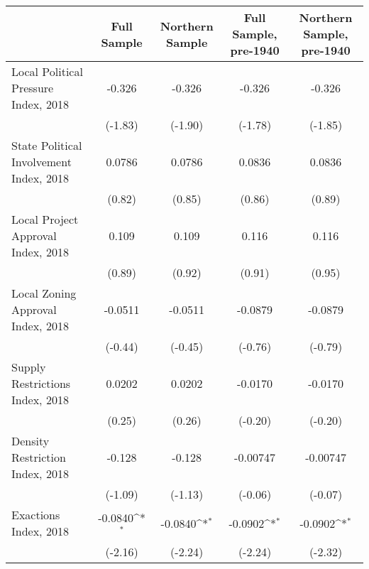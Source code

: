\begin{table}[htbp]\centering
\def\sym#1{\ifmmode^{#1}\else\(^{#1}\)\fi}
\caption{ \label{tab1}}
\begin{tabular}{l*{4}{c}}
\toprule
                    &\multicolumn{1}{c}{Full Sample}&\multicolumn{1}{c}{Northern Sample}&\multicolumn{1}{c}{Full Sample, pre-1940}&\multicolumn{1}{c}{Northern Sample, pre-1940}\\
\midrule
Local Political Pressure Index, 2018&      -0.326         &      -0.326         &      -0.326         &      -0.326         \\
                    &     (-1.83)         &     (-1.90)         &     (-1.78)         &     (-1.85)         \\
\addlinespace
State Political Involvement Index, 2018&      0.0786         &      0.0786         &      0.0836         &      0.0836         \\
                    &      (0.82)         &      (0.85)         &      (0.86)         &      (0.89)         \\
\addlinespace
Local Project Approval Index, 2018&       0.109         &       0.109         &       0.116         &       0.116         \\
                    &      (0.89)         &      (0.92)         &      (0.91)         &      (0.95)         \\
\addlinespace
Local Zoning Approval Index, 2018&     -0.0511         &     -0.0511         &     -0.0879         &     -0.0879         \\
                    &     (-0.44)         &     (-0.45)         &     (-0.76)         &     (-0.79)         \\
\addlinespace
Supply Restrictions Index, 2018&      0.0202         &      0.0202         &     -0.0170         &     -0.0170         \\
                    &      (0.25)         &      (0.26)         &     (-0.20)         &     (-0.20)         \\
\addlinespace
Density Restriction Index, 2018&      -0.128         &      -0.128         &    -0.00747         &    -0.00747         \\
                    &     (-1.09)         &     (-1.13)         &     (-0.06)         &     (-0.07)         \\
\addlinespace
Exactions Index, 2018&     -0.0840\sym{*}  &     -0.0840\sym{*}  &     -0.0902\sym{*}  &     -0.0902\sym{*}  \\
                    &     (-2.16)         &     (-2.24)         &     (-2.24)         &     (-2.32)         \\

\end{tabular}
\end{table}
